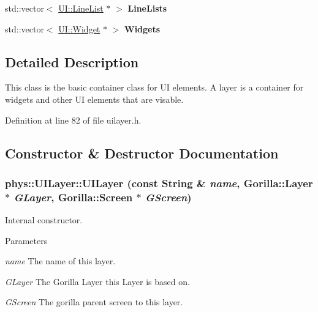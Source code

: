\begin{DoxyCompactItemize}
\item 
\hypertarget{classphys_1_1UILayer_ac71d32f223284d0b94d91cfc526c3b84}{
std::vector$<$ \hyperlink{classphys_1_1UI_1_1LineList}{UI::LineList} $\ast$ $>$ {\bfseries LineLists}}
\label{da/d48/classphys_1_1UILayer_ac71d32f223284d0b94d91cfc526c3b84}

\item 
\hypertarget{classphys_1_1UILayer_a21707b7751f5184986eb3d73de2581b5}{
std::vector$<$ \hyperlink{classphys_1_1UI_1_1Widget}{UI::Widget} $\ast$ $>$ {\bfseries Widgets}}
\label{da/d48/classphys_1_1UILayer_a21707b7751f5184986eb3d73de2581b5}

\end{DoxyCompactItemize}


\subsection{Detailed Description}
This class is the basic container class for UI elements. A layer is a container for widgets and other UI elements that are visable. 

Definition at line 82 of file uilayer.h.



\subsection{Constructor \& Destructor Documentation}
\hypertarget{classphys_1_1UILayer_aee4df9be8deb377bc7905c785ddf2819}{
\subsubsection[{UILayer}]{\setlength{\rightskip}{0pt plus 5cm}phys::UILayer::UILayer (const {\bf String} \& {\em name}, \/  Gorilla::Layer $\ast$ {\em GLayer}, \/  Gorilla::Screen $\ast$ {\em GScreen})}}
\label{da/d48/classphys_1_1UILayer_aee4df9be8deb377bc7905c785ddf2819}


Internal constructor. 


\begin{DoxyParams}{Parameters}
\item[{\em name}]The name of this layer. \item[{\em GLayer}]The Gorilla Layer this Layer is based on. \item[{\em GScreen}]The gorilla parent screen to this layer. \end{DoxyParams}


